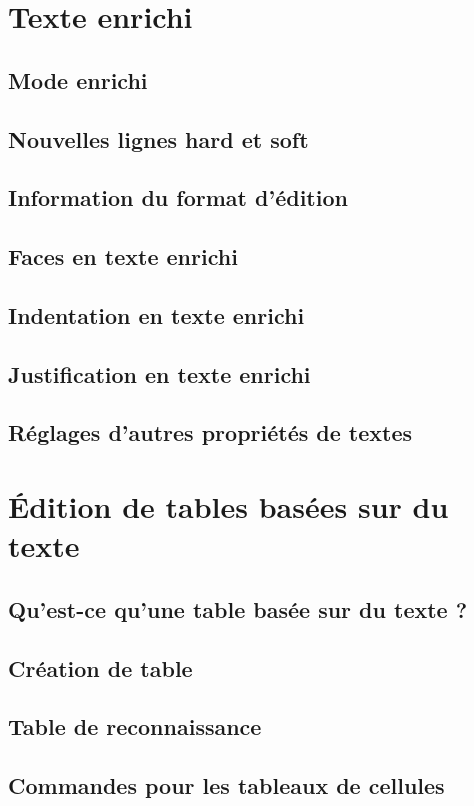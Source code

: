 \section{Texte enrichi}
\subsection{Mode enrichi}
\subsection{Nouvelles lignes hard et soft}
\subsection{Information du format d'édition}
\subsection{Faces en texte enrichi}
\subsection{Indentation en texte enrichi}
\subsection{Justification en texte enrichi}
\subsection{Réglages d'autres propriétés de textes}
\section{\'Edition de tables basées sur du texte}
\subsection{Qu'est-ce qu'une table basée sur du texte
  ?} 
\subsection{Création de table} 
\subsection{Table de reconnaissance} 
\subsection{Commandes pour les tableaux de
  cellules}  
